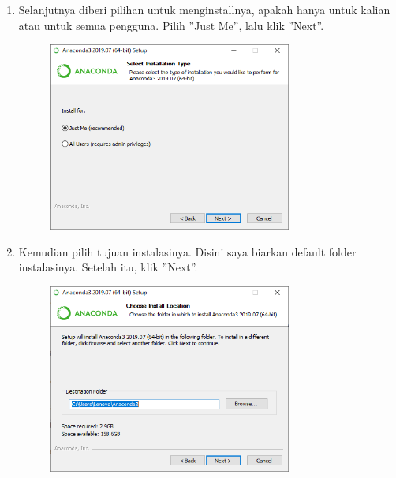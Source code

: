 \begin{enumerate}
	\item Selanjutnya diberi pilihan untuk menginstallnya, apakah hanya untuk kalian atau untuk semua pengguna. Pilih ''Just Me'', lalu klik ''Next''.
	\begin{figure}[!htbp]
	\centering
		\includegraphics[width=8cm]{figures/anaconda2.PNG}
	\end{figure}
\newpage
	\item Kemudian pilih tujuan instalasinya. Disini saya biarkan default folder instalasinya. Setelah itu, klik ''Next''.
	\begin{figure}[!htbp]
		\centering
		\includegraphics[width=8cm]{figures/anaconda3.PNG}
	\end{figure}


\end{enumerate}
